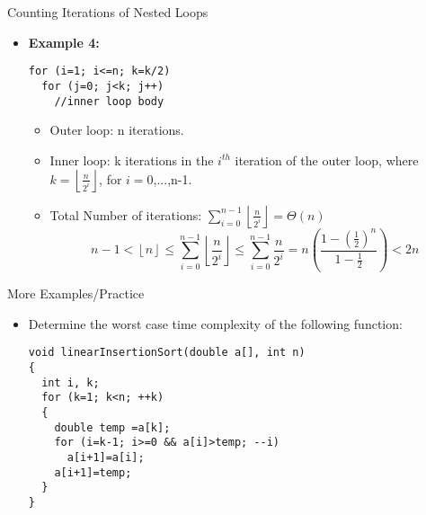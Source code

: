 \item Counting Iterations of Nested Loops
  \begin{itemize}
  \item \textbf{Example 4:}
\begin{lstlisting}
for (i=1; i<=n; k=k/2)
  for (j=0; j<k; j++)
    //inner loop body
\end{lstlisting}
    \begin{itemize}
    \item Outer loop: n iterations.
    \item Inner loop: k iterations in the $i^{th}$ iteration of the outer loop, where $k=\left\lfloor\frac{n}{2^{i}}\right\rfloor$, for $i=0$,...,n-1.
    \item Total Number of iterations: $\displaystyle \sum\limits_{i=0}^{n-1}\left\lfloor\frac{n}{2^{i}}\right\rfloor =\Theta (n)$
    $$n-1 < \left\lfloor n\right\rfloor \leq \sum\limits_{i=0}^{n-1}\left\lfloor\frac{n}{2^{i}}\right\rfloor \leq \sum\limits_{i=0}^{n-1}\frac{n}{2^{i}} = n\left(\frac{1-\left(\frac{1}{2}\right)^{n}}{1-\frac{1}{2}}\right) < 2n$$
    \end{itemize}
  \end{itemize}
\item More Examples/Practice
  \begin{itemize}
  \item Determine the worst case time complexity of the following function:
\begin{lstlisting}
void linearInsertionSort(double a[], int n)
{
  int i, k;
  for (k=1; k<n; ++k)
  {
    double temp =a[k];
    for (i=k-1; i>=0 && a[i]>temp; --i)
      a[i+1]=a[i];
    a[i+1]=temp;
  }
}
\end{lstlisting}
  \end{itemize}
